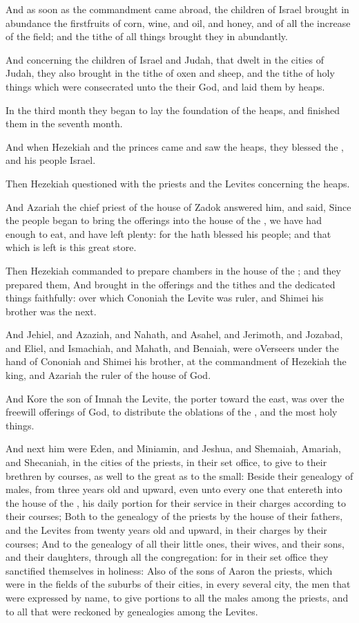 \Verse And as soon as the commandment came abroad, the children of Israel brought in abundance the firstfruits of corn, wine, and oil, and honey, and of all the increase of the field; and the tithe of all things brought they in abundantly.

\Verse And concerning the children of Israel and Judah, that dwelt in the cities of Judah, they also brought in the tithe of oxen and sheep, and the tithe of holy things which were consecrated unto the \LORD their God, and laid them by heaps.

\Verse In the third month they began to lay the foundation of the heaps, and finished them in the seventh month.

\Verse And when Hezekiah and the princes came and saw the heaps, they blessed the \LORD, and his people Israel.

\Verse Then Hezekiah questioned with the priests and the Levites concerning the heaps.

\Verse And Azariah the chief priest of the house of Zadok answered him, and said, Since the people began to bring the offerings into the house of the \LORD, we have had enough to eat, and have left plenty: for the \LORD hath blessed his people; and that which is left is this great store.

\Verse Then Hezekiah commanded to prepare chambers in the house of the \LORD; and they prepared them, \Verse And brought in the offerings and the tithes and the dedicated things faithfully: over which Cononiah the Levite was ruler, and Shimei his brother was the next.

\Verse And Jehiel, and Azaziah, and Nahath, and Asahel, and Jerimoth, and Jozabad, and Eliel, and Ismachiah, and Mahath, and Benaiah, were oVerseers under the hand of Cononiah and Shimei his brother, at the commandment of Hezekiah the king, and Azariah the ruler of the house of God.

\Verse And Kore the son of Imnah the Levite, the porter toward the east, was over the freewill offerings of God, to distribute the oblations of the \LORD, and the most holy things.

\Verse And next him were Eden, and Miniamin, and Jeshua, and Shemaiah, Amariah, and Shecaniah, in the cities of the priests, in their set office, to give to their brethren by courses, as well to the great as to the small: \Verse Beside their genealogy of males, from three years old and upward, even unto every one that entereth into the house of the \LORD, his daily portion for their service in their charges according to their courses; \Verse Both to the genealogy of the priests by the house of their fathers, and the Levites from twenty years old and upward, in their charges by their courses; \Verse And to the genealogy of all their little ones, their wives, and their sons, and their daughters, through all the congregation: for in their set office they sanctified themselves in holiness: \Verse Also of the sons of Aaron the priests, which were in the fields of the suburbs of their cities, in every several city, the men that were expressed by name, to give portions to all the males among the priests, and to all that were reckoned by genealogies among the Levites.

